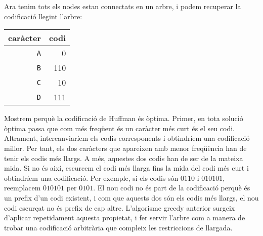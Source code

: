 Ara tenim tots els nodes estan connectats en un arbre, i
podem recuperar la codificació llegint l'arbre:
\begin{centre}
\begin{tabular}{rr}
caràcter & codi \\
\hline
\texttt{A} & 0 \\
\texttt{B} & 110 \\
\texttt{C} & 10 \\
\texttt{D} & 111 \\
\end{tabular}
\end{centre}

Mostrem perquè la codificació de Huffman és òptima.  Primer, en tota
solució òptima passa que com més freqüent és un caràcter més curt és
el seu codi. Altrament, intercanviaríem els codis corresponents i
obtindríem una codificació millor.  Per tant, els dos caràcters que
apareixen amb menor freqüència han de tenir els codis més llargs. A
més, aquestes dos codis han de ser de la mateixa mida. Si no
és així, escurcem el codi més llarga fins la mida del codi més curt i
obtindríem una codificació. Per exemple, si els codis són
$0110$ i $010101$, reemplacem $010101$ per $0101$. El nou codi no
és part de la codificació perquè és un prefix d'un codi existent, i
com que aquests dos són els codis més llargs, el nou codi escurçat no
és prefix de cap altre. L'algorisme greedy anterior surgeix d'aplicar
repetidament aquesta propietat, i fer servir l'arbre com a manera de
trobar una codificació arbitrària que compleix les restriccions de
llargada.
